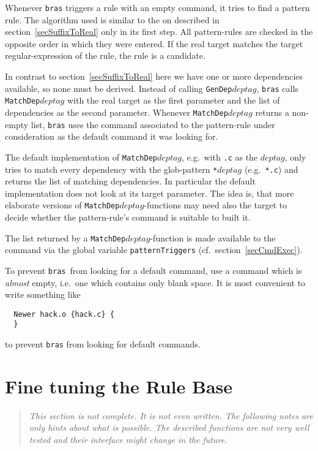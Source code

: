 \documentclass[12pt]{article}
\newcommand{\bras}{\texttt{bras}}
\begin{document}
Whenever \bras{} triggers a rule with an empty command, it tries to
find a pattern rule. The algorithm used is similar to the on described in
section~\ref{secSuffixToReal} only in its first step. All
pattern-rules are checked in the opposite order in which they were
entered. If the real target matches the target regular-expression of
the rule, the rule is a candidate.

In contrast to section~\ref{secSuffixToReal} here we have one or more
dependencies available, so none must be derived. Instead of calling
\texttt{GenDep$deptag$}, \bras{} calls \texttt{MatchDep$deptag$} with
the real target as the first parameter and the list of dependencies as
the second parameter. Whenever \texttt{MatchDep$deptag$} returns a
non-empty list, \bras{} uses the command associated to the
pattern-rule under consideration as the default command it was looking
for. 

The default implementation of \texttt{MatchDep$deptag$}, e.g.\ with
\texttt{.c} as the $deptag$, only tries to match every dependency with
the glob-pattern \texttt{*$deptag$} (e.g.\ \texttt{*.c}) and returns
the list of matching dependencies. In particular the default
implementation does not look at its target parameter. The idea is,
that more elaborate versions of \texttt{MatchDep$deptag$}-functions
may need also the target to decide whether the pattern-rule's command
is suitable to built it.

The list returned by a \texttt{MatchDep$deptag$}-function is made
available to the command via the global variable
\texttt{patternTriggers} (cf.\ section~\ref{secCmdExec}).

To prevent \bras\ from looking for a default command, use a command
which is \textit{almost} empty, i.e.\ one which contains only blank
space. It is most convenient to write something like
\begin{verbatim}
  Newer hack.o {hack.c} {
  }
\end{verbatim}
to prevent \bras{} from looking for default commands.

\section{Fine tuning the Rule Base}
\begin{quote}\itshape
This section is not complete. It is not even written. The following
notes are only hints about what is possible. The described functions
are not very well tested and their interface might change in the
future.
\end{quote}
\end{document}
